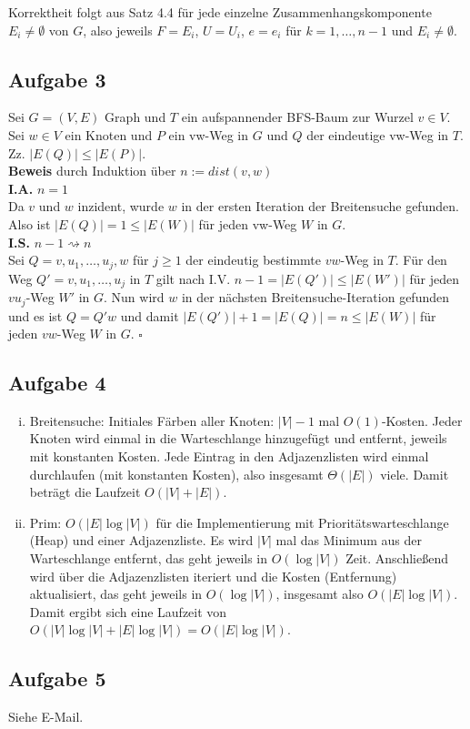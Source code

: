 \documentclass[11pt,a4paper,ngerman]{article}
\begin{document}
Korrektheit folgt aus Satz 4.4 für jede einzelne Zusammenhangskomponente $E_i \neq \emptyset$ von $G$, also jeweils $F = E_i$, $U = U_i$, $e = e_i$ für $k = 1,\ldots,n-1$ und $E_i \neq \emptyset$.
\subsection*{Aufgabe 3}
Sei $G = (V,E)$ Graph und $T$ ein aufspannender BFS-Baum zur Wurzel $v \in V$. Sei $w \in V$ ein Knoten und $P$ ein vw-Weg in $G$ und $Q$ der eindeutige vw-Weg in $T$. Zz. $|E(Q)| \leq |E(P)|$. \\

\textbf{Beweis} durch Induktion über $n := dist(v,w)$ \\
\textbf{I.A.} $n = 1$ \\
Da $v$ und $w$ inzident, wurde $w$ in der ersten Iteration der Breitensuche gefunden. Also ist $|E(Q)| = 1 \leq |E(W)|$ für jeden vw-Weg $W$ in $G$. \\

\textbf{I.S.} $n-1 \rightsquigarrow n$ \\
Sei $Q = v,u_1,\ldots,u_j,w$ für $j \geq 1$ der eindeutig bestimmte $vw$-Weg in $T$.
Für den Weg $Q' = v,u_1,\ldots,u_j$ in $T$ gilt nach I.V. $n-1 = |E(Q')| \leq |E(W')|$ für jeden $vu_j$-Weg $W'$ in $G$.
Nun wird $w$ in der nächsten Breitensuche-Iteration gefunden und es ist $Q = Q'w$ und damit $|E(Q')|+1 =|E(Q)| = n  \leq |E(W)|$ für jeden $vw$-Weg $W$ in $G$.
\mbox{} \hfill $\square$
\subsection*{Aufgabe 4}
\begin{enumerate}[i)]
\item Breitensuche: Initiales Färben aller Knoten: $|V|-1$ mal $O(1)$-Kosten. Jeder Knoten wird einmal in die Warteschlange hinzugefügt und entfernt, jeweils mit konstanten Kosten. Jede Eintrag in den Adjazenzlisten wird einmal durchlaufen (mit konstanten Kosten), also insgesamt $\Theta(|E|)$ viele. Damit beträgt die Laufzeit $O(|V| + |E|)$.
\item Prim: $O(|E| \log |V|)$ für die Implementierung mit Prioritätswarteschlange (Heap) und einer Adjazenzliste. Es wird $|V|$ mal das Minimum aus der Warteschlange entfernt, das geht jeweils in $O(\log |V|)$ Zeit. Anschließend wird über die Adjazenzlisten iteriert und die Kosten (Entfernung) aktualisiert, das geht jeweils in $O(\log |V|)$, insgesamt also $O(|E| \log |V|)$. Damit ergibt sich eine Laufzeit von $O(|V| \log |V| + |E| \log |V|) = O(|E| \log |V|)$.
\end{enumerate}

\subsection*{Aufgabe 5}
Siehe E-Mail.

\label{LastPage}
\end{document}
